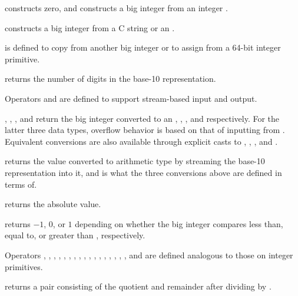 \begin{compactitem}
  \item {} constructs zero, and  constructs a big integer from an integer .
  \item {} constructs a big integer from a C string or an  .
  \item {} is defined to copy from another big integer or to assign from a 64-bit integer primitive.
  \item {} returns the number of digits in the base-10 representation.
  \item Operators \inlinecode{\textgreater{}\textgreater{}} and \inlinecode{\textless{}\textless{}} are defined to support stream-based input and output.
  \item {}, , , and  return the big integer converted to an , , , and  respectively. For the latter three data types, overflow behavior is based on that of inputting from . Equivalent conversions are also available through explicit casts to , , , and .
  \item {} returns the value converted to arithmetic type  by streaming the base-10 representation into it, and is what the three conversions above are defined in terms of.
  \item {} returns the absolute value.
  \item {} returns $-1$, $0$, or $1$ depending on whether the big integer compares less than, equal to, or greater than , respectively.
  \item Operators \inlinecode{\textless{}}, \inlinecode{\textgreater{}}, \inlinecode{\textless{}=}, \inlinecode{\textgreater{}=}, \inlinecode{==}, \inlinecode{!=}, \inlinecode{+}, \inlinecode{-}, \inlinecode{*}, \inlinecode{/}, \inlinecode{\%}, \inlinecode{++}, \inlinecode{--}, \inlinecode{+=}, \inlinecode{-=}, \inlinecode{*=}, \inlinecode{/=}, and \inlinecode{\%=} are defined analogous to those on integer primitives.
  \item {} returns a pair consisting of the quotient and remainder after dividing by .

\end{compactitem}
